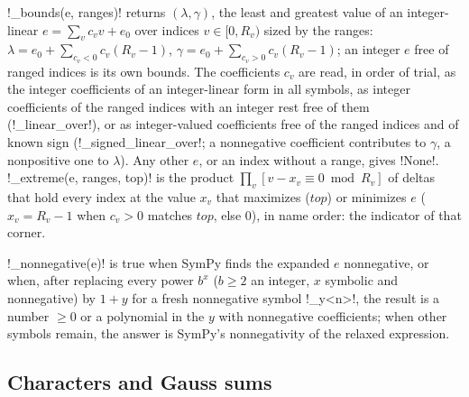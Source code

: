 \begin{definition}\label{def:algebra-bounds}
\py!_bounds(e, ranges)! returns $(\lambda,\gamma)$, the least and greatest value of an integer-linear $e=\sum_v c_vv+e_0$ over indices $v\in[0,R_v)$ sized by the ranges: $\lambda=e_0+\sum_{c_v<0}c_v(R_v-1)$, $\gamma=e_0+\sum_{c_v>0}c_v(R_v-1)$; an integer $e$ free of ranged indices is its own bounds. The coefficients $c_v$ are read, in order of trial, as the integer coefficients of an integer-linear form in all symbols, as integer coefficients of the ranged indices with an integer rest free of them (\py!_linear_over!), or as integer-valued coefficients free of the ranged indices and of known sign (\py!_signed_linear_over!; a nonnegative coefficient contributes to $\gamma$, a nonpositive one to $\lambda$). Any other $e$, or an index without a range, gives \py!None!. \py!_extreme(e, ranges, top)! is the product $\prod_v[v-x_v\equiv 0\bmod R_v]$ of deltas that hold every index at the value $x_v$ that maximizes ($\mathit{top}$) or minimizes $e$ ($x_v=R_v-1$ when $c_v>0$ matches $\mathit{top}$, else $0$), in name order: the indicator of that corner.
\end{definition}

\begin{definition}\label{def:algebra-nonnegative}
\py!_nonnegative(e)! is true when SymPy finds the expanded $e$ nonnegative, or when, after replacing every power $b^x$ ($b\ge 2$ an integer, $x$ symbolic and nonnegative) by $1+y$ for a fresh nonnegative symbol \code!_y<n>!, the result is a number $\ge 0$ or a polynomial in the $y$ with nonnegative coefficients; when other symbols remain, the answer is SymPy's nonnegativity of the relaxed expression.
\end{definition}

\subsection{Characters and Gauss sums}\label{sec:algebra-simplify-characters}

